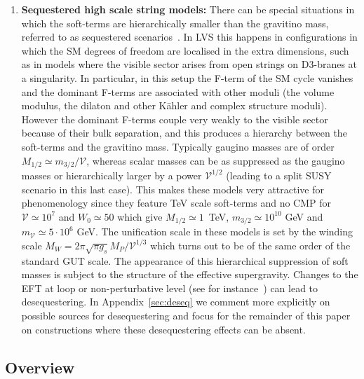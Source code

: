 \documentclass[11pt,a4paper]{article}
\newcommand\vo{{\mathcal{V}}}
\begin{document}
\begin{enumerate}
\item{\bf Sequestered high scale string models:}
There can be special situations in which the soft-terms are hierarchically smaller than the gravitino mass, referred to as
sequestered scenarios~\cite{Blumenhagen:2009gk}.
In LVS this happens in configurations in which the SM degrees of freedom are localised in the extra dimensions,
such as in models where the visible sector arises from open strings on D3-branes at a singularity.
In particular, in this setup the F-term of the SM cycle vanishes and the dominant F-terms are associated with other moduli
(the volume modulus, the dilaton and other K\"ahler and complex structure moduli).
However the dominant F-terms couple very weakly to the visible sector because of their bulk separation,
and this produces a hierarchy between the soft-terms and the gravitino mass.
Typically gaugino masses are of order $M_{1/2}\simeq m_{3/2}/\vo$,
whereas scalar masses can be as suppressed as the gaugino masses or hierarchically larger by a power $\vo^{1/2}$
(leading to a split SUSY scenario in this last case).
This makes these models very attractive for phenomenology since they feature TeV scale soft-terms
and no CMP for $\vo\simeq 10^7$ and $W_0\simeq 50$ which give
$M_{1/2}\simeq 1$~TeV, $m_{3/2}\simeq 10^{10}$ GeV and $m_\vo \simeq 5\cdot 10^6$ GeV. The unification scale in these models is set by
the winding scale $M_W = 2 \pi\sqrt{\pi g_s} M_P / \vo^{1/3}$ \cite{Conlon:2009xf,Conlon:2009kt} which turns out to be of the same order of the standard GUT scale. The appearance of this hierarchical suppression of soft masses is subject to the structure of the effective supergravity. Changes to the EFT at loop or non-perturbative level (see for instance~\cite{Conlon:2010ji,Choi:2010gm, Berg:2010ha, Conlon:2011jq,Berg:2012aq}) can lead to desequestering. In Appendix~\ref{sec:deseq} we comment more explicitly on possible sources for desequestering and focus for the remainder of this paper on constructions where these desequestering effects can be absent.
\end{enumerate}

\subsection{Overview}
\end{document}

